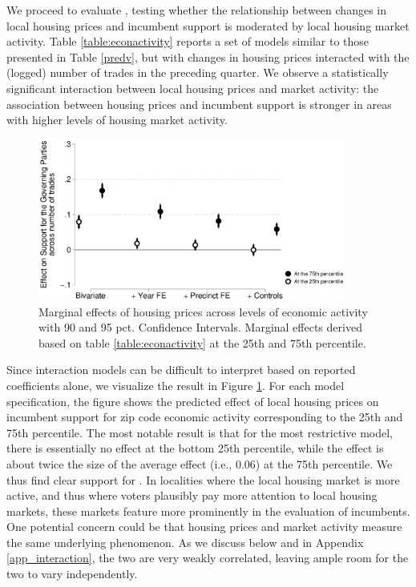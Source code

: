 \documentclass[12pt,a4paper]{article}
\begin{document}
	
	
	
	
	We proceed to evaluate \htwo, testing whether the relationship between changes in local housing prices and incumbent support is moderated by local housing market activity. Table \ref{table:econactivity} reports a set of models similar to those presented in Table \ref{predv}, but with changes in housing prices interacted with the (logged) number of trades in the preceding quarter. We observe a statistically significant interaction between local housing prices and market activity: the association between housing prices and incumbent support is stronger in areas with higher levels of housing market activity. 
	
	
	
	
	\begin{figure}[htbp!]
		\includegraphics[width=0.9\textwidth]{../figures/localactivity.eps}
		\centering
		\caption{Marginal effects of housing prices across levels of economic activity with 90  and 95 pct. Confidence Intervals.  Marginal effects derived based on table \ref{table:econactivity} at the 25th and 75th percentile.}\label{localactivity}
	\end{figure}
	
	Since interaction models can be difficult to interpret based on reported coefficients alone, we visualize the result in Figure \ref{localactivity}. For each model specification, the figure shows the predicted effect of local housing prices on incumbent support for zip code economic activity corresponding to  the 25th and 75th percentile. The most notable result is that for the most restrictive model, there is essentially no effect at the bottom 25th percentile, while the effect is about twice the size of the average effect  (i.e., 0.06) at the 75th percentile. We thus find clear support for \htwo. In localities where the local housing market is more active, and thus where voters plausibly pay more attention to local housing markets, these markets feature more prominently in the evaluation of incumbents. One potential concern could be that housing prices and market activity measure the same underlying phenomenon. As we discuss below and in Appendix \ref{app_interaction}, the two are very weakly correlated, leaving ample room for the two to vary independently.
	
\end{document}
